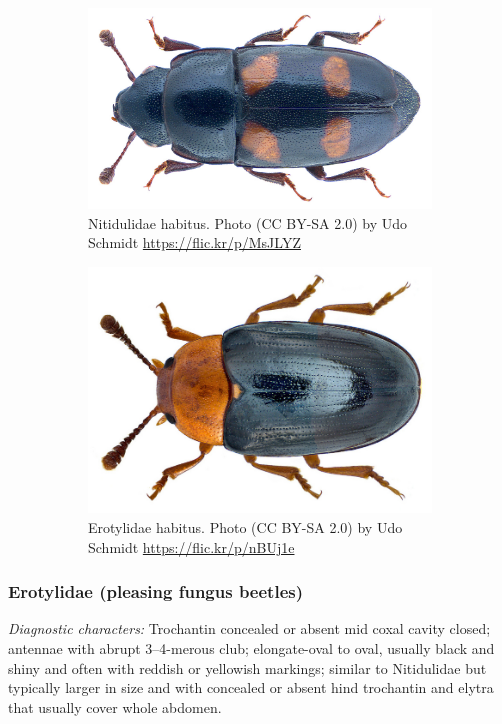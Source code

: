 \documentclass[letterpaper, 11pt]{article}
\begin{document}
\begin{figure}[ht!]
  \centering
\begin{subfigure}[ht!]{0.43\textwidth}
    \includegraphics[width=\textwidth]{NitidulidHabitus}
  \caption{Nitidulidae habitus. Photo (CC BY-SA 2.0) by Udo Schmidt \url{https://flic.kr/p/MsJLYZ}}
  \label{fig:nitidulid}
\end{subfigure}
    \qquad
\begin{subfigure}[ht!]{0.41\textwidth}
    \includegraphics[width=\textwidth]{ErotylidHabitus}
  \caption{Erotylidae habitus. Photo (CC BY-SA 2.0) by Udo Schmidt \url{https://flic.kr/p/nBUj1e}}
  \label{fig:erotylid}\end{subfigure}
    \caption{}\label{fig:erotylnitid}
\end{figure}

\subsubsection{Erotylidae (pleasing fungus beetles)}
\noindent{}\textit{Diagnostic characters:} Trochantin concealed or absent mid coxal cavity closed; antennae with abrupt 3--4-merous club; elongate-oval to oval, usually black and shiny and often with reddish or yellowish markings; similar to Nitidulidae but typically larger in size and with concealed or absent hind trochantin and elytra that usually cover whole abdomen.\\
\end{document}
